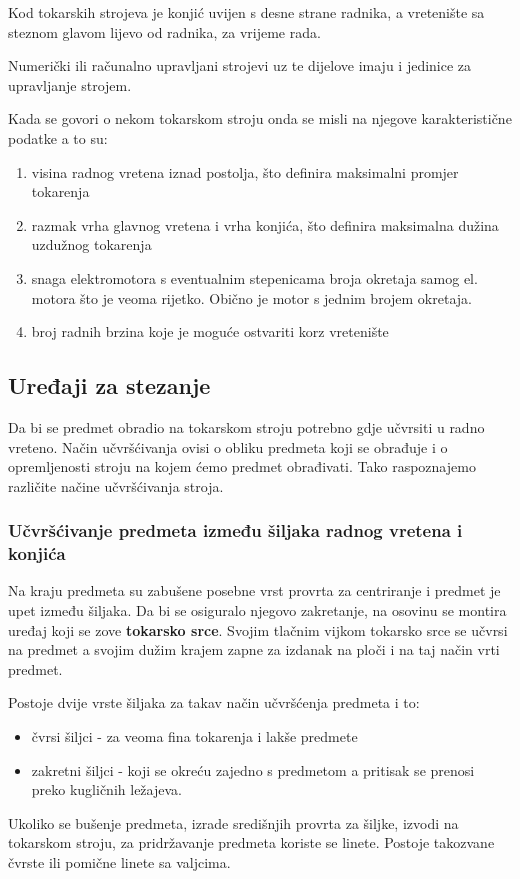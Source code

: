 \documentclass[a4paper,12pt]{article}
\numberwithin{figure}{section}
\begin{document}
Kod tokarskih strojeva je konjić uvijen s desne strane radnika, a vretenište sa steznom glavom lijevo od radnika, za vrijeme rada.\par
Numerički ili računalno upravljani strojevi uz te dijelove imaju i jedinice za upravljanje strojem. \par
Kada se govori o nekom tokarskom stroju onda se misli na njegove karakteristične podatke a to su:
\begin{enumerate}
\item visina radnog vretena iznad postolja, što definira maksimalni promjer tokarenja
\item razmak vrha glavnog vretena i vrha konjića, što definira maksimalna dužina uzdužnog tokarenja
\item snaga elektromotora s eventualnim stepenicama broja okretaja samog el. motora što je veoma rijetko. Obično je motor s jednim brojem okretaja.
\item broj radnih brzina koje je moguće ostvariti korz vretenište
\end{enumerate}
\subsection{Uređaji za stezanje}
Da bi se predmet obradio na tokarskom stroju potrebno gdje učvrsiti u radno vreteno. Način učvršćivanja ovisi o obliku predmeta koji se obrađuje i o opremljenosti stroju na kojem ćemo predmet obrađivati. Tako raspoznajemo različite načine učvršćivanja stroja.
\subsubsection{Učvršćivanje predmeta između šiljaka radnog vretena i konjića}
\par
Na kraju predmeta su zabušene posebne vrst provrta za centriranje i predmet je upet između šiljaka. Da bi se osiguralo njegovo zakretanje, na osovinu se montira uređaj koji se zove \textbf{tokarsko srce}. Svojim tlačnim vijkom tokarsko srce se učvrsi na predmet a svojim dužim krajem zapne za izdanak na ploči i na taj način vrti predmet.\par
Postoje dvije vrste šiljaka za takav način učvršćenja predmeta i to:
\begin{itemize}
\item čvrsi šiljci - za veoma fina tokarenja i lakše predmete
\item zakretni šiljci - koji se okreću zajedno s predmetom a pritisak se prenosi preko kugličnih ležajeva.
\end{itemize}
Ukoliko se bušenje predmeta, izrade središnjih provrta za šiljke, izvodi na tokarskom stroju, za pridržavanje predmeta koriste se linete. Postoje takozvane čvrste ili pomične linete sa valjcima.
\end{document}
